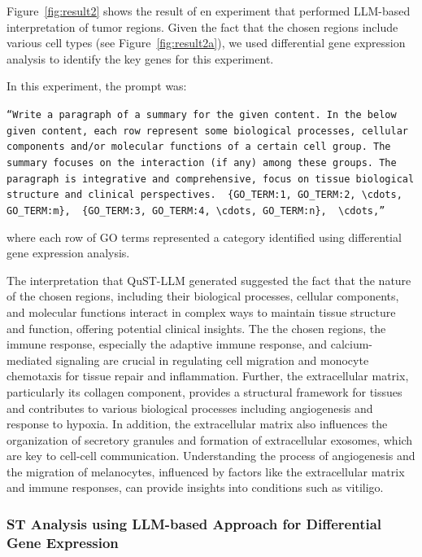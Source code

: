 \documentclass{article}
\begin{document}
Figure~\ref{fig:result2} shows the result of en experiment that performed LLM-based interpretation of tumor regions. Given the fact that the chosen regions include various cell types (see Figure~\ref{fig:result2a}), we used differential gene expression analysis to identify the key genes for this experiment. 

In this experiment, the prompt was:
\begin{center}%
	\parbox{0.9\textwidth}{%
		\texttt{``Write a paragraph of a summary for the given content. In the below given content, each row represent some biological processes, cellular components and/or molecular functions of a certain cell group. The summary focuses on the interaction (if any) among these groups. The paragraph is integrative and comprehensive, focus on tissue biological structure and clinical perspectives.
			\\\\\{GO\_TERM:$1$, GO\_TERM:$2$, $\cdots$, GO\_TERM:$m$\},\\\\%
			\{GO\_TERM:$3$, GO\_TERM:$4$, $\cdots$, GO\_TERM:$n$\},\\\\$\cdots$,''}}%
\end{center}%
where each row of GO terms represented a category identified using differential gene expression analysis.

The  interpretation that QuST-LLM generated suggested the fact that the nature of the chosen regions, including their biological processes, cellular components, and molecular functions interact in complex ways to maintain tissue structure and function, offering potential clinical insights. The the chosen regions, the immune response, especially the adaptive immune response, and calcium-mediated signaling are crucial in regulating cell migration and monocyte chemotaxis for tissue repair and inflammation. Further, the extracellular matrix, particularly its collagen component, provides a structural framework for tissues and contributes to various biological processes including angiogenesis and response to hypoxia. In addition, the extracellular matrix also influences the organization of secretory granules and formation of extracellular exosomes, which are key to cell-cell communication. Understanding the process of angiogenesis and the migration of melanocytes, influenced by factors like the extracellular matrix and immune responses, can provide insights into conditions such as vitiligo.

\subsubsection{ST Analysis  using LLM-based Approach for Differential Gene Expression}
\label{sec:llm4deg}
\end{document}
